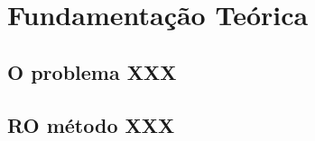 \chapter{Fundamentação Teórica} \label{fundamentacao}

\section{O problema XXX}


\section{RO método XXX}


